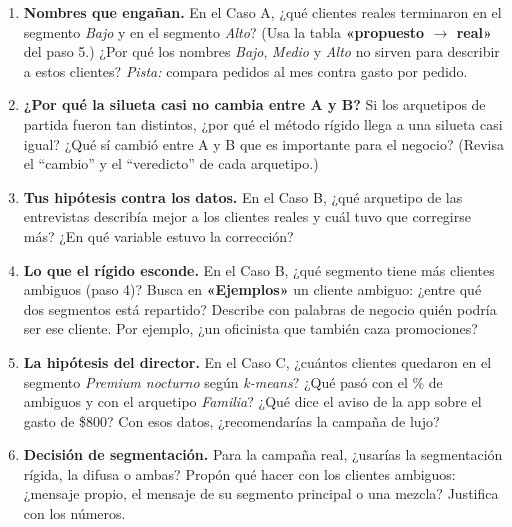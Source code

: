 \documentclass[11pt,letterpaper]{article}
\newcommand{\app}[1]{\textbf{\color{guindaOsc}«#1»}}
\begin{document}
\begin{enumerate}[leftmargin=*,label=\textbf{\color{guinda}\arabic*.},itemsep=0.6em]
\item \textbf{Nombres que enga\~nan.} En el Caso A, ¿qu\'e clientes reales terminaron en el segmento \emph{Bajo} y en el segmento \emph{Alto}? (Usa la tabla \app{propuesto $\to$ real} del paso 5.) ¿Por qu\'e los nombres \emph{Bajo}, \emph{Medio} y \emph{Alto} no sirven para describir a estos clientes? \emph{Pista:} compara pedidos al mes contra gasto por pedido.
\item \textbf{¿Por qu\'e la silueta casi no cambia entre A y B?} Si los arquetipos de partida fueron tan distintos, ¿por qu\'e el m\'etodo r\'igido llega a una silueta casi igual? ¿Qu\'e s\'i cambi\'o entre A y B que es importante para el negocio? (Revisa el \enquote{cambio} y el \enquote{veredicto} de cada arquetipo.)
\item \textbf{Tus hip\'otesis contra los datos.} En el Caso B, ¿qu\'e arquetipo de las entrevistas describ\'ia mejor a los clientes reales y cu\'al tuvo que corregirse m\'as? ¿En qu\'e variable estuvo la correcci\'on?
\item \textbf{Lo que el r\'igido esconde.} En el Caso B, ¿qu\'e segmento tiene m\'as clientes ambiguos (paso 4)? Busca en \app{Ejemplos} un cliente ambiguo: ¿entre qu\'e dos segmentos est\'a repartido? Describe con palabras de negocio qui\'en podr\'ia ser ese cliente. Por ejemplo, ¿un oficinista que tambi\'en caza promociones?
\item \textbf{La hip\'otesis del director.} En el Caso C, ¿cu\'antos clientes quedaron en el segmento \emph{Premium nocturno} seg\'un \emph{k-means}? ¿Qu\'e pas\'o con el \% de ambiguos y con el arquetipo \emph{Familia}? ¿Qu\'e dice el aviso de la app sobre el gasto de \$800? Con esos datos, ¿recomendar\'ias la campa\~na de lujo?
\item \textbf{Decisi\'on de segmentaci\'on.} Para la campa\~na real, ¿usar\'ias la segmentaci\'on r\'igida, la difusa o ambas? Prop\'on qu\'e hacer con los clientes ambiguos: ¿mensaje propio, el mensaje de su segmento principal o una mezcla? Justifica con los n\'umeros.
\end{enumerate}

\end{document}
